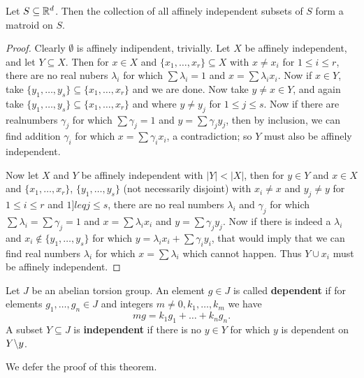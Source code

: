 \begin{theorem}\label{1.2.4}
    Let $S \subseteq \mathbb{R}^d$. Then the collection of all affinely independent subsets of  $S$ form a
    matroid on $S$.
\end{theorem}
\begin{proof}
    Clearly $\emptyset$ is affinely indipendent, trivially. Let $X$ be affinely independent, and let
     $Y \subseteq X$. Then for  $x \in X$ and  $\{x_1, \dots, x_r\} \subseteq X$ with $x \neq x_i$
     for  $1 \leq i \leq r$, there are no real nubers  $\lambda_i$ for which  $\sum{\lambda_i}=1$ and
     $x=\sum{\lambda_ix_i}$. Now if $x \in Y$, take  $\{y_1, \dots, y_s\} \subseteq \{x_1, \dots,
     x_r\}$ and we are done. Now take $y \neq x \in Y$, and again take $\{y_1, \dots, y_s\} \subseteq \{x_1, \dots,
     x_r\}$ and where $y \neq y_j$ for  $1 \leq j \leq s$. Now if there are realnumbers  $\gamma_j$
     for which  $\sum{\gamma_j}=1$ and $y=\sum{\gamma_jy_j}$, then by inclusion, we can find
     addition $\gamma_i$ for which  $x=\sum{\gamma_ix_i}$, a contradiction; so $Y$ must also be
     affinely independent.
     
     Now let  $X$ and $Y$ be affinely independent with  $|Y|<|X|$, then for  $y \in Y$ and  $x \in
     X$ and  $\{x_1, \dots, x_r\}$, $\{y_1, \dots, y_s\}$ (not necessarily disjoint) with $x_i \neq
     x$ and  $y_j \neq y$ for  $1 \leq i \leq r$ and  $1 ]leq j \leq s$, there are no real numbers
     $\lambda_i$ and  $\gamma_j$ for which  $\sum{\lambda_i}=\sum{\gamma_j}=1$ and
     $x=\sum{\lambda_ix_i}$ and $y=\sum{\gamma_jy_j}$. Now if there is indeed a $\lambda_i$ and
     $x_i \notin \{y_1, \dots, y_s\}$ for which $y=\lambda_ix_i+\sum{\gamma_iy_i}$, that would imply
     that we can find real numbers $\lambda_i$ for which  $x=\sum{\lambda_i}$ which cannot happen.
     Thus $Y \cup x_i$ must be affinely independent.
\end{proof}

\begin{definition}
    Let $J$ be an abelian torsion group. An element  $g \in J$ is called \textbf {dependent} if for
    elements $ g_1, \dots, g_n \in J$ and integers $m \neq 0, k_1, \dots, k_m$ we have 
        \begin{equation}
            mg=k_1g_1+\dots+k_ng_n.
        \end{equation}
    A subset $Y \subseteq J$ is \textbf {independent} if there is no $y \in Y$ for which  $y$ is
    dependent on  $Y\backslash y$.
\end{definition}
We defer the proof of this theorem.
